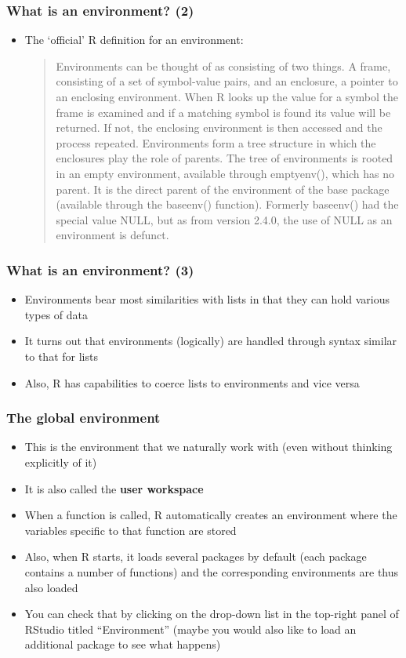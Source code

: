 \documentclass[10pt]{beamer}
\theoremstyle{definition}
\begin{document}
\begin{frame}[fragile]
\frametitle{What is an environment? (2)}
\begin{itemize}
	\item The `official' R definition for an environment:
	\begin{quotation}
		\noindent Environments can be thought of as consisting of two things. A frame, consisting of a set of symbol-value pairs, and an enclosure, a pointer to an enclosing environment. When R looks up the value for a symbol the frame is examined and if a matching symbol is found its value will be returned. If not, the enclosing environment is then accessed and the process repeated. Environments form a tree structure in which the enclosures play the role of parents. The tree of environments is rooted in an empty environment, available through emptyenv(), which has no parent. It is the direct parent of the environment of the base package (available through the baseenv() function). Formerly baseenv() had the special value NULL, but as from version 2.4.0, the use of NULL as an environment is defunct.
	\end{quotation} 	
\end{itemize}
\end{frame}

\begin{frame}[fragile]
\frametitle{What is an environment? (3)}
\begin{itemize}
	\item Environments bear most similarities with lists in that they can hold various types of data
	\item It turns out that environments (logically) are handled through syntax similar to that for lists
	\item Also, R has capabilities to coerce lists to environments and vice versa
\end{itemize}
\end{frame}

\begin{frame}[fragile]
\frametitle{The global environment}
\begin{itemize}
	\item This is the environment that we naturally work with (even without thinking explicitly of it)
	\item It is also called the \textbf{user workspace}
	\item When a function is called, R automatically creates an environment where the variables specific to that function are stored
	\item Also, when R starts, it loads several packages by default (each package contains a number of functions) and the corresponding environments are thus also loaded
	\item You can check that by clicking on the drop-down list in the top-right panel of RStudio titled ``Environment'' (maybe you would also like to load an additional package to see what happens)
\end{itemize}
\end{frame}
\end{document}
